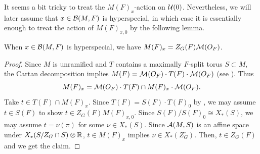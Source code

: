 \documentclass[12pt,reqno]{amsart}
\begin{document}


It seems a bit tricky to treat the $M(F)_x$-action on ${\mathcal{U}}(0)$. Nevertheless, we will later assume that $x \in {\mathcal{B}}(M, F)$ is hyperspecial, in which case it is essentially enough to treat the action of $M(F)_{x, 0}$ by the following lemma. 

\begin{lem} \label{lem:hyperspecial_M(F)_x}
    When $x \in {\mathcal{B}}(M, F)$ is hyperspecial, we have $M(F)_x = Z_G(F) {\mathcal{M}}(O_F)$. 
\end{lem}
\begin{proof}
    Since $M$ is unramified and $T$ contains a maximally $F$-split torus $S \subset M$, the Cartan decomposition implies $M(F) = {\mathcal{M}}(O_F) \cdot T(F) \cdot {\mathcal{M}}(O_F)$ (see \cite[Theorem 5.2.1]{KP23}). Thus
    \[
        M(F)_x = {\mathcal{M}}(O_F) \cdot T(F) \cap M(F)_x \cdot {\mathcal{M}}(O_F). 
    \]
    Take $t \in T(F) \cap M(F)_x$. Since $T(F) = S(F) \cdot T(F)_0$ by \cite[Lemma 7.1.1]{Kal11}, we may assume $t \in S(F)$ to show $t \in Z_G(F) M(F)_{x, 0}$. Since $S(F) / S(F)_0 \cong X_*(S)$, we may assume $t = \nu(\pi)$ for some $\nu \in X_*(S)$. Since ${\mathcal{A}}(M, S)$ is an affine space under $X_*(S / Z_G \cap S) \otimes \mathbb{R}$, $t \in M(F)_x$ implies $\nu \in X_*(Z_G^\circ)$. Then, $t \in Z_G(F)$ and we get the claim. 
\end{proof}
\end{document}
